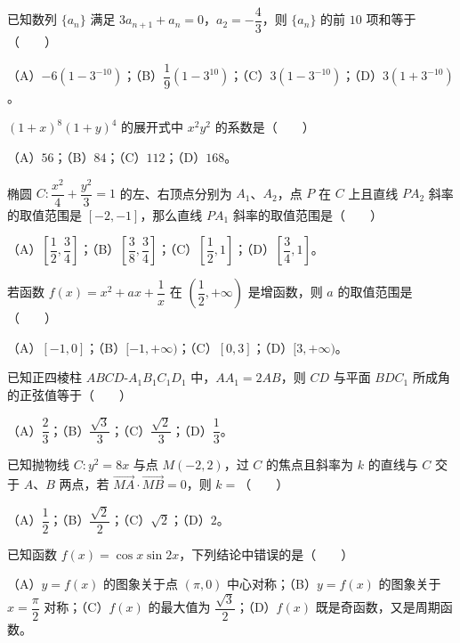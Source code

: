\begin{question}
已知数列 $\{a_n\}$ 满足 $3a_{n+1}+a_n=0$，$a_2=-\dfrac43$，则 $\{a_n\}$ 的前 $10$ 项和等于\mbox{（　　）}

（A）$-6(1-3^{-10})$；（B）$\dfrac19(1-3^{10})$；（C）$3(1-3^{-10})$；（D）$3(1+3^{-10})$。

\end{question}
\begin{question}
$(1+x)^8(1+y)^4$ 的展开式中 $x^2y^2$ 的系数是\mbox{（　　）}

（A）$56$；（B）$84$；（C）$112$；（D）$168$。

\end{question}
\begin{question}
椭圆 $C:\dfrac{x^2}4+\dfrac{y^2}3=1$ 的左、右顶点分别为 $A_1$、$A_2$，点 $P$ 在 $C$ 上且直线 $PA_2$ 斜率的取值范围是 $[-2,-1]$，那么直线 $PA_1$ 斜率的取值范围是\mbox{（　　）}

（A）$\left[\dfrac12,\dfrac34\right]$；（B）$\left[\dfrac38,\dfrac34\right]$；（C）$\left[\dfrac12,1\right]$；（D）$\left[\dfrac34,1\right]$。

\end{question}
\begin{question}
若函数 $f(x)=x^2+ax+\dfrac1x$ 在 $\left(\dfrac12,+\infty\right)$ 是增函数，则 $a$ 的取值范围是\mbox{（　　）}

（A）$[-1,0]$；（B）$[-1,+\infty)$；（C）$[0,3]$；（D）$[3,+\infty)$。

\end{question}
\begin{question}
已知正四棱柱 $ABCD\text{-}A_1B_1C_1D_1$ 中，$AA_1=2AB$，则 $CD$ 与平面 $BDC_1$ 所成角的正弦值等于\mbox{（　　）}

（A）$\dfrac23$；（B）$\dfrac{\sqrt3}3$；（C）$\dfrac{\sqrt2}3$；（D）$\dfrac13$。

\end{question}
\begin{question}
已知抛物线 $C:y^2=8x$ 与点 $M(-2,2)$，过 $C$ 的焦点且斜率为 $k$ 的直线与 $C$ 交于 $A$、$B$ 两点，若 $\overrightarrow{MA}\cdot\overrightarrow{MB}=0$，则 $k=$\mbox{（　　）}

（A）$\dfrac12$；（B）$\dfrac{\sqrt2}2$；（C）$\sqrt2$；（D）$2$。

\end{question}
\begin{question}
已知函数 $f(x)=\cos x\sin2x$，下列结论中错误的是\mbox{（　　）}

（A）$y=f(x)$ 的图象关于点 $(\pi,0)$ 中心对称；（B）$y=f(x)$ 的图象关于 $x=\dfrac\pi2$ 对称；（C）$f(x)$ 的最大值为 $\dfrac{\sqrt3}2$；（D）$f(x)$ 既是奇函数，又是周期函数。

\end{question}

